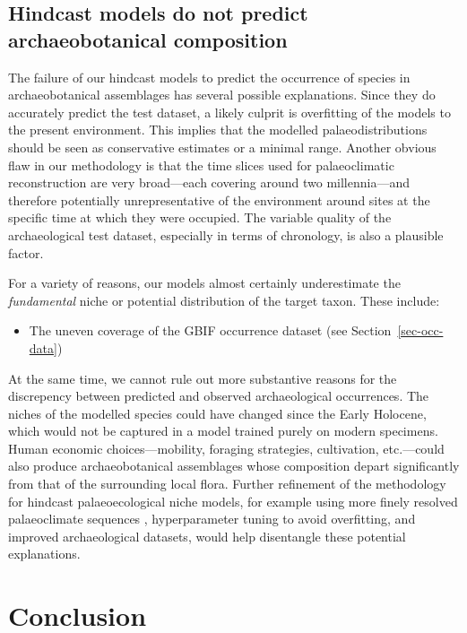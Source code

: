 \documentclass[
  authoryear,
  preprint]{elsarticle}
\providecommand{\tightlist}{%
  \setlength{\itemsep}{0pt}\setlength{\parskip}{0pt}}\usepackage{longtable,booktabs,array}
\begin{document}
\subsection{Hindcast models do not predict archaeobotanical
composition}\label{sec-discuss-hindcasting}

The failure of our hindcast models to predict the occurrence of species
in archaeobotanical assemblages has several possible explanations. Since
they do accurately predict the test dataset, a likely culprit is
overfitting of the models to the present environment. This implies that
the modelled palaeodistributions should be seen as conservative
estimates or a minimal range. Another obvious flaw in our methodology is
that the time slices used for palaeoclimatic reconstruction are very
broad---each covering around two millennia---and therefore potentially
unrepresentative of the environment around sites at the specific time at
which they were occupied. The variable quality of the archaeological
test dataset, especially in terms of chronology, is also a plausible
factor.

For a variety of reasons, our models almost certainly underestimate the
\emph{fundamental} niche or potential distribution of the target taxon.
These include:

\begin{itemize}
\tightlist
\item
  The uneven coverage of the GBIF occurrence dataset (see
  Section~\ref{sec-occ-data})
\end{itemize}

At the same time, we cannot rule out more substantive reasons for the
discrepency between predicted and observed archaeological occurrences.
The niches of the modelled species could have changed since the Early
Holocene, which would not be captured in a model trained purely on
modern specimens. Human economic choices---mobility, foraging
strategies, cultivation, etc.---could also produce archaeobotanical
assemblages whose composition depart significantly from that of the
surrounding local flora. Further refinement of the methodology for
hindcast palaeoecological niche models, for example using more finely
resolved palaeoclimate sequences \citep[e.g.][]{KargerEtAl2023},
hyperparameter tuning to avoid overfitting, and improved archaeological
datasets, would help disentangle these potential explanations.

\section{Conclusion}\label{conclusion}
\end{document}

